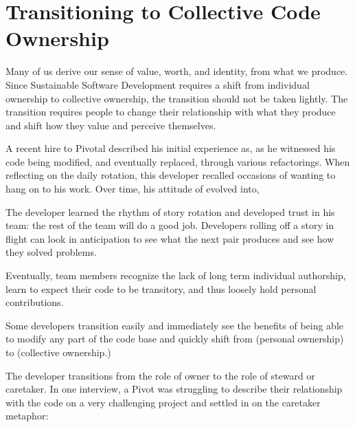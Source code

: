 \begin{table}[]
\section{Transitioning to Collective Code Ownership}
\label{Transitioning}
Many of us derive our sense of value, worth, and identity, from what we produce. Since Sustainable Software Development requires a shift from individual ownership to collective ownership, the transition should not be taken lightly. The transition requires people to change their relationship with what they produce and shift how they value and perceive themselves. 

A recent hire to Pivotal described his initial experience as,  as he witnessed his code being modified, and eventually replaced, through various refactorings. When reflecting on the daily rotation, this developer recalled occasions of wanting to hang on to his work.  Over time, his attitude of  evolved into,  

The developer learned the rhythm of story rotation and developed trust in his team: the rest of the team will do a good job. Developers rolling off a story in flight can look in anticipation to see what the next pair produces and see how they solved problems. 

Eventually, team members recognize the lack of long term individual authorship, learn to expect their code to be transitory, and thus loosely hold personal contributions.   

Some developers transition easily and immediately see the benefits of being able to modify any part of the code base and quickly shift from  (personal ownership) to  (collective ownership.)

The developer transitions from the role of owner to the role of steward or caretaker. In one interview, a Pivot was struggling to describe their relationship with the code on a very challenging project and settled in on the caretaker metaphor: 


\end{table}
